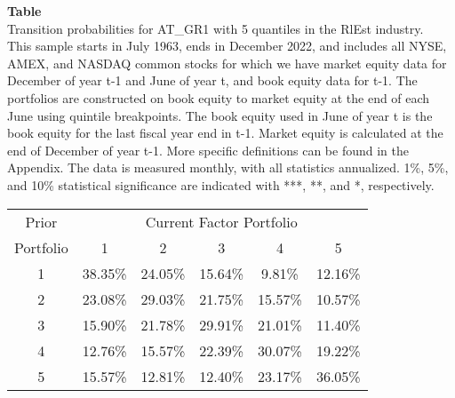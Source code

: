 \begin{table*}[ht!]
\raggedright
{}
\label{tab: transition_probs_AT_GR1_RlEst_with_5_quantiles}
\textbf{Table \thetable} \\
Transition probabilities for AT_GR1 with 5 quantiles in the RlEst industry. \\
\hspace*{1em}This sample starts in July 1963, ends in December 2022, and includes all NYSE, AMEX, and NASDAQ common stocks for which we have market equity data for December of year t-1 and June of year t, and book equity data for t-1. The portfolios are constructed on book equity to market equity at the end of each June using quintile breakpoints.  The book equity used in June of year t is the book equity for the last fiscal year end in t-1.  Market equity is calculated at the end of December of year t-1.  More specific definitions can be found in the Appendix.  The data is measured monthly, with all statistics annualized.  1\%, 5\%, and 10\% statistical significance are indicated with ***, **, and *, respectively. \\
\vspace{0.5em}
\centering
\begin{adjustbox}{max width=\textwidth}
\begin{tabular}{@{}cccccc@{}}
\toprule
Prior & \multicolumn{5}{c}{Current Factor Portfolio} \\
Portfolio & 1 & 2 & 3 & 4 & 5 \\
\midrule
1 & 38.35\% & 24.05\% & 15.64\% & 9.81\% & 12.16\% \\
2 & 23.08\% & 29.03\% & 21.75\% & 15.57\% & 10.57\% \\
3 & 15.90\% & 21.78\% & 29.91\% & 21.01\% & 11.40\% \\
4 & 12.76\% & 15.57\% & 22.39\% & 30.07\% & 19.22\% \\
5 & 15.57\% & 12.81\% & 12.40\% & 23.17\% & 36.05\% \\
\bottomrule
\end{tabular}
\end{adjustbox}
\end{table*}